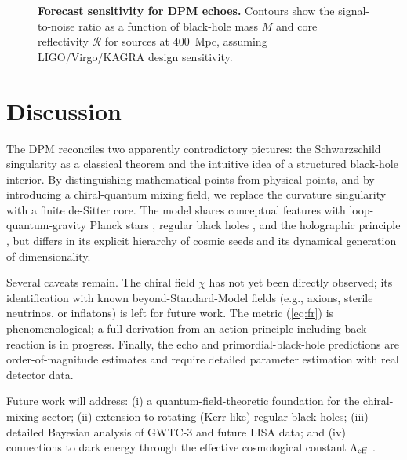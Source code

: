 \documentclass[11pt,a4paper]{article}
\begin{document}
\begin{figure}[htbp]
\centering
{}
\caption{\textbf{Forecast sensitivity for DPM echoes.} Contours show the signal-to-noise ratio as a function of black-hole mass $M$ and core reflectivity $\mathcal{R}$ for sources at 400~Mpc, assuming LIGO/Virgo/KAGRA design sensitivity.}
\label{fig:snr}
\end{figure}

\section{Discussion}

The DPM reconciles two apparently contradictory pictures: the Schwarzschild singularity as a classical theorem and the intuitive idea of a structured black-hole interior. By distinguishing mathematical points from physical points, and by introducing a chiral-quantum mixing field, we replace the curvature singularity with a finite de-Sitter core. The model shares conceptual features with loop-quantum-gravity Planck stars \cite{ashtekar2006,rovelli2014}, regular black holes \cite{bardeen1968,hayward2006}, and the holographic principle \cite{thooft1993,susskind1995}, but differs in its explicit hierarchy of cosmic seeds and its dynamical generation of dimensionality.

Several caveats remain. The chiral field $\chi$ has not yet been directly observed; its identification with known beyond-Standard-Model fields (e.g., axions, sterile neutrinos, or inflatons) is left for future work. The metric (\ref{eq:fr}) is phenomenological; a full derivation from an action principle including back-reaction is in progress. Finally, the echo and primordial-black-hole predictions are order-of-magnitude estimates and require detailed parameter estimation with real detector data.

Future work will address: (i) a quantum-field-theoretic foundation for the chiral-mixing sector; (ii) extension to rotating (Kerr-like) regular black holes; (iii) detailed Bayesian analysis of GWTC-3 and future LISA data; and (iv) connections to dark energy through the effective cosmological constant $\Lambda_{\rm eff}$ \cite{riess1998}.
\end{document}
